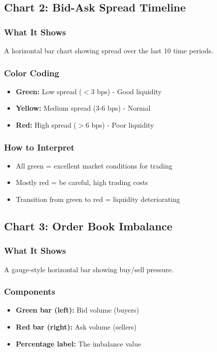 \documentclass[12pt,a4paper]{article}
\begin{document}
\subsection{Chart 2: Bid-Ask Spread Timeline}

\subsubsection{What It Shows}
A horizontal bar chart showing spread over the last 10 time periods.

\subsubsection{Color Coding}
\begin{itemize}
    \item \textbf{Green:} Low spread ($<$3 bps) - Good liquidity
    \item \textbf{Yellow:} Medium spread (3-6 bps) - Normal
    \item \textbf{Red:} High spread ($>$6 bps) - Poor liquidity
\end{itemize}

\subsubsection{How to Interpret}
\begin{itemize}
    \item All green = excellent market conditions for trading
    \item Mostly red = be careful, high trading costs
    \item Transition from green to red = liquidity deteriorating
\end{itemize}

\subsection{Chart 3: Order Book Imbalance}

\subsubsection{What It Shows}
A gauge-style horizontal bar showing buy/sell pressure.

\subsubsection{Components}
\begin{itemize}
    \item \textbf{Green bar (left):} Bid volume (buyers)
    \item \textbf{Red bar (right):} Ask volume (sellers)
    \item \textbf{Percentage label:} The imbalance value
\end{itemize}
\end{document}
